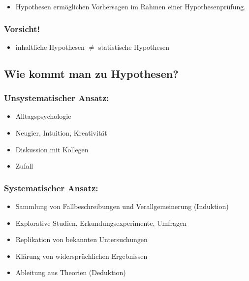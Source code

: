 \documentclass[
]{book}
\providecommand{\tightlist}{%
  \setlength{\itemsep}{0pt}\setlength{\parskip}{0pt}}
\begin{document}
\begin{itemize}
\tightlist
\item
  Hypothesen ermöglichen Vorhersagen im Rahmen einer Hypothesenprüfung.
\end{itemize}

\hypertarget{vorsicht}{%
\subsubsection{Vorsicht!}\label{vorsicht}}

\begin{itemize}
\tightlist
\item
  inhaltliche Hypothesen \(\neq\) statistische Hypothesen
\end{itemize}

\hypertarget{wie-kommt-man-zu-hypothesen}{%
\subsection{Wie kommt man zu Hypothesen?}\label{wie-kommt-man-zu-hypothesen}}

\hypertarget{unsystematischer-ansatz}{%
\subsubsection{Unsystematischer Ansatz:}\label{unsystematischer-ansatz}}

\begin{itemize}
\tightlist
\item
  Alltagspsychologie
\item
  Neugier, Intuition, Kreativität
\item
  Diskussion mit Kollegen
\item
  Zufall
\end{itemize}

\hypertarget{systematischer-ansatz}{%
\subsubsection{Systematischer Ansatz:}\label{systematischer-ansatz}}

\begin{itemize}
\tightlist
\item
  Sammlung von Fallbeschreibungen und Verallgemeinerung (Induktion)
\item
  Explorative Studien, Erkundungsexperimente, Umfragen
\item
  Replikation von bekannten Untersuchungen
\item
  Klärung von widersprüchlichen Ergebnissen
\item
  Ableitung aus Theorien (Deduktion)
\end{itemize}
\end{document}
